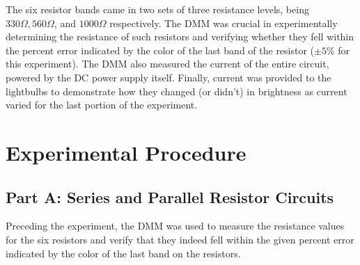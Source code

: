 \documentclass{article}
\theoremstyle{definition}
\begin{document}
The six resistor bands came in two sets of three resistance levels, being $330 \Omega, 560 \Omega$, and 
$1000 \Omega$ respectively. The DMM was crucial in experimentally determining the resistance of such resistors
and verifying whether they fell within the percent error indicated by the color of the last band of the resistor 
($\pm 5\%$ for this experiment). The DMM also measured the current of the entire circuit, powered by the 
DC power supply itself. Finally, current was provided to the lightbulbs to demonstrate how they changed (or didn't) in brightness as current varied
for the last portion of the experiment.
\section{Experimental Procedure}
\subsection*{Part A: Series and Parallel Resistor Circuits}
Preceding the experiment, the DMM was used to measure the resistance values for the six resistors and verify that they indeed
fell within the given percent error indicated by the color of the last band on the resistors. 
\end{document}
